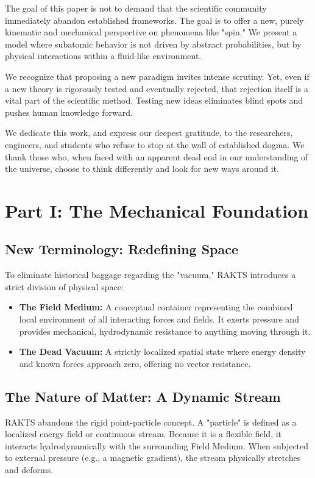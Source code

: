 \documentclass[reprint,amsmath,amssymb,aps,prd,twocolumn]{revtex4-2}
\begin{document}
The goal of this paper is not to demand that the scientific community immediately abandon established frameworks. The goal is to offer a new, purely kinematic and mechanical perspective on phenomena like "spin." We present a model where subatomic behavior is not driven by abstract probabilities, but by physical interactions within a fluid-like environment.

We recognize that proposing a new paradigm invites intense scrutiny. Yet, even if a new theory is rigorously tested and eventually rejected, that rejection itself is a vital part of the scientific method. Testing new ideas eliminates blind spots and pushes human knowledge forward.

We dedicate this work, and express our deepest gratitude, to the researchers, engineers, and students who refuse to stop at the wall of established dogma. We thank those who, when faced with an apparent dead end in our understanding of the universe, choose to think differently and look for new ways around it.

\section{Part I: The Mechanical Foundation}

\subsection{New Terminology: Redefining Space}
To eliminate historical baggage regarding the "vacuum," RAKTS introduces a strict division of physical space:
\begin{itemize}
    \item \textbf{The Field Medium:} A conceptual container representing the combined local environment of all interacting forces and fields. It exerts pressure and provides mechanical, hydrodynamic resistance to anything moving through it.
    \item \textbf{The Dead Vacuum:} A strictly localized spatial state where energy density and known forces approach zero, offering no vector resistance.
\end{itemize}

\subsection{The Nature of Matter: A Dynamic Stream}
RAKTS abandons the rigid point-particle concept. A "particle" is defined as a localized energy field or continuous stream. Because it is a flexible field, it interacts hydrodynamically with the surrounding Field Medium. When subjected to external pressure (e.g., a magnetic gradient), the stream physically stretches and deforms.
\end{document}
